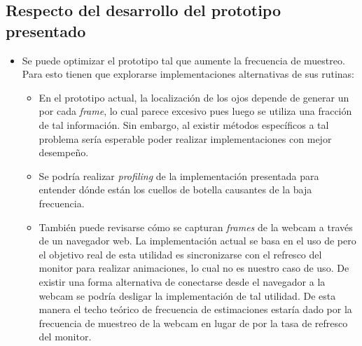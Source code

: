\subsection{Respecto del desarrollo del prototipo presentado}

  \begin{itemize}
    \item
      Se puede optimizar el prototipo tal que aumente la frecuencia de
      muestreo.
      Para esto tienen que explorarse implementaciones alternativas de sus
      rutinas:
      \begin{itemize}

        \item
          En el prototipo actual, la localización de los ojos depende de
          generar un \facemesh por cada \textit{frame}, lo cual parece
          excesivo pues luego se utiliza una fracción de tal información.
          Sin embargo, al existir métodos específicos a tal problema
          \cite{hansen_2009_eye_of_the_beholder} sería esperable poder realizar
          implementaciones con mejor desempeño.
  
        \item
          Se podría realizar \textit{profiling} de la implementación presentada
          para entender dónde están los cuellos de botella causantes de la
          baja frecuencia. 

  
        \item
          También puede revisarse cómo se capturan \textit{frames} de la webcam
          a través de un navegador web.
          La implementación actual se basa en el uso de \raf pero el objetivo
          real de esta utilidad es sincronizarse con el refresco del monitor
          para realizar animaciones, lo cual no es nuestro caso de uso.
          De existir una forma alternativa de conectarse desde el navegador a
          la webcam se podría desligar la implementación de tal utilidad.
          De esta manera el techo teórico de frecuencia de estimaciones estaría
          dado por la frecuencia de muestreo de la webcam en lugar de por la
          tasa de refresco del monitor.

      \end{itemize}
  

\end{itemize}
